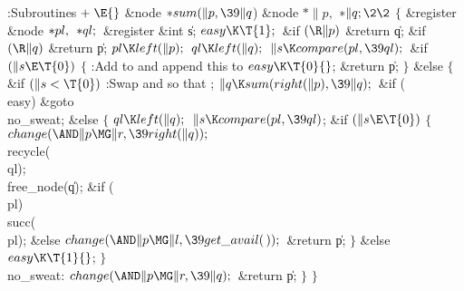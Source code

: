 \Y\B\4:Subroutines\X${}\mathrel+\E{}$\6
\&{node} ${}{*}\\{sum}(\|p,\39\|q{}$)%
\1\1\6
\&{node} ${}{*}\|p,{}$ ${}{*}\|q;\2\2{}$\6
${}\{{}$\1\6
\&{register} \&{node} ${}{*}\\{pl},{}$ ${}{*}\\{ql};{}$\6
\&{register} \&{int} \|s;\7
${}\\{easy}\K\T{1};{}$\6
\&{if} ${}(\R\|p){}$\1\5
\&{return} \|q;\2\6
\&{if} ${}(\R\|q){}$\1\5
\&{return} \|p;\2\6
${}\\{pl}\K\\{left}(\|p);{}$\6
${}\\{ql}\K\\{left}(\|q);{}$\6
${}\|s\K\\{compare}(\\{pl},\39\\{ql});{}$\6
\&{if} ${}(\|s\E\T{0}){}$\5
${}\{{}$\1\6
:Add  to  and append this to \X\6
${}\\{easy}\K\T{0}{}$;\5
\&{return} \|p;\6
\4${}\}{}$\2\6
\&{else}\5
${}\{{}$\1\6
\&{if} ${}(\|s<\T{0}){}$\1\5
:Swap  and  so that \X;\2\6
${}\|q\K\\{sum}(\\{right}(\|p),\39\|q);{}$\6
\&{if} (\\{easy})\1\5
\&{goto} \\{no\_sweat};\2\6
\&{else}\5
${}\{{}$\1\6
${}\\{ql}\K\\{left}(\|q);{}$\6
${}\|s\K\\{compare}(\\{pl},\39\\{ql}){}$;\6
\&{if} ${}(\|s\E\T{0}){}$\5
${}\{{}$\1\6
${}\\{change}({\AND}\|p\MG\|r,\39\\{right}(\|q));{}$\6
\\{recycle}(\\{ql});\5
\\{free\_node}(\|q);\6
\&{if} (\\{pl})\1\5
\\{succ}(\\{pl});\2\6
\&{else}\1\5
${}\\{change}({\AND}\|p\MG\|l,\39\\{get\_avail}(\,));{}$\2\6
\&{return} \|p;\6
\4${}\}{}$\2\6
\&{else}\1\5
${}\\{easy}\K\T{1}{}$;\2\6
\4${}\}{}$\2\6
\4\\{no\_sweat}:\5
${}\\{change}({\AND}\|p\MG\|r,\39\|q);{}$\6
\&{return} \|p;\6
\4${}\}{}$\2\6
\4${}\}{}$\2\par
\fi

